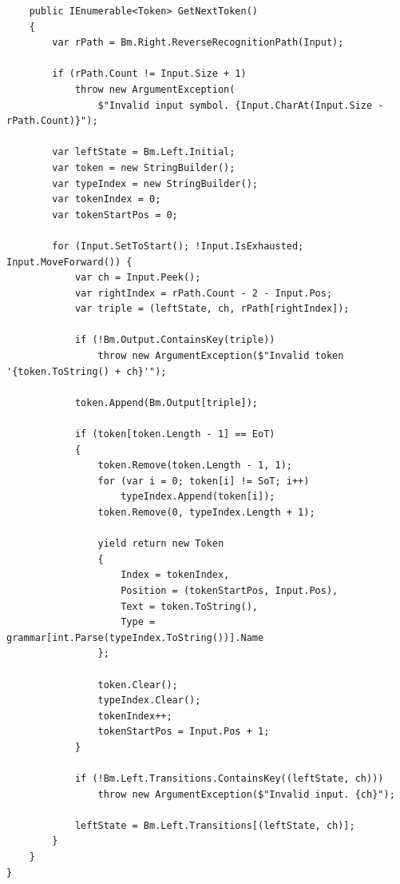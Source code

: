\documentclass[12pt, oneside]{article}
\theoremstyle{definition}
\begin{document}
\begin{verbatim}
    public IEnumerable<Token> GetNextToken()
    {
        var rPath = Bm.Right.ReverseRecognitionPath(Input);

        if (rPath.Count != Input.Size + 1)
            throw new ArgumentException(
                $"Invalid input symbol. {Input.CharAt(Input.Size - rPath.Count)}");

        var leftState = Bm.Left.Initial;
        var token = new StringBuilder();
        var typeIndex = new StringBuilder();
        var tokenIndex = 0;
        var tokenStartPos = 0;

        for (Input.SetToStart(); !Input.IsExhausted; Input.MoveForward()) {
            var ch = Input.Peek();
            var rightIndex = rPath.Count - 2 - Input.Pos;
            var triple = (leftState, ch, rPath[rightIndex]);

            if (!Bm.Output.ContainsKey(triple))
                throw new ArgumentException($"Invalid token '{token.ToString() + ch}'");

            token.Append(Bm.Output[triple]);

            if (token[token.Length - 1] == EoT)
            {
                token.Remove(token.Length - 1, 1);
                for (var i = 0; token[i] != SoT; i++)
                    typeIndex.Append(token[i]);
                token.Remove(0, typeIndex.Length + 1);

                yield return new Token
                {
                    Index = tokenIndex,
                    Position = (tokenStartPos, Input.Pos),
                    Text = token.ToString(),
                    Type = grammar[int.Parse(typeIndex.ToString())].Name
                };

                token.Clear();
                typeIndex.Clear();
                tokenIndex++;
                tokenStartPos = Input.Pos + 1;
            }

            if (!Bm.Left.Transitions.ContainsKey((leftState, ch)))
                throw new ArgumentException($"Invalid input. {ch}");

            leftState = Bm.Left.Transitions[(leftState, ch)];
        }
    }
}
\end{verbatim}
\end{document}
